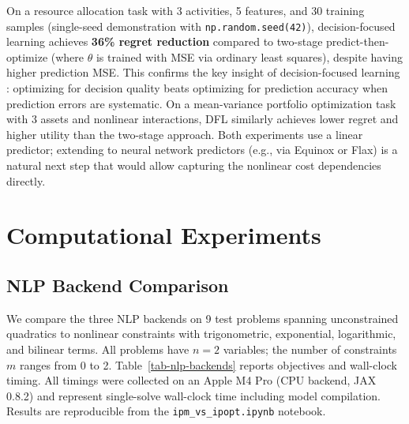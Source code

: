 \documentclass[12pt,preprint]{article}
\begin{document}
On a resource allocation task with 3 activities, 5 features, and 30 training samples (single-seed demonstration with \texttt{np.random.seed(42)}), decision-focused learning achieves \textbf{36\% regret reduction} compared to two-stage predict-then-optimize (where $\theta$ is trained with MSE via ordinary least squares), despite having higher prediction MSE. This confirms the key insight of decision-focused learning \cite{Elmachtoub2022}: optimizing for decision quality beats optimizing for prediction accuracy when prediction errors are systematic. On a mean-variance portfolio optimization task with 3 assets and nonlinear interactions, DFL similarly achieves lower regret and higher utility than the two-stage approach. Both experiments use a linear predictor; extending to neural network predictors (e.g., via Equinox or Flax) is a natural next step that would allow capturing the nonlinear cost dependencies directly.


\section{Computational Experiments}
\label{org-computational-experiments}
\subsection{NLP Backend Comparison}
\label{org-nlp-backend-comparison}
We compare the three NLP backends on 9 test problems spanning unconstrained quadratics to nonlinear constraints with trigonometric, exponential, logarithmic, and bilinear terms. All problems have $n = 2$ variables; the number of constraints $m$ ranges from 0 to 2. Table~\ref{tab-nlp-backends} reports objectives and wall-clock timing. All timings were collected on an Apple M4 Pro (CPU backend, JAX 0.8.2) and represent single-solve wall-clock time including model compilation. Results are reproducible from the \texttt{ipm\_vs\_ipopt.ipynb} notebook.
\end{document}
